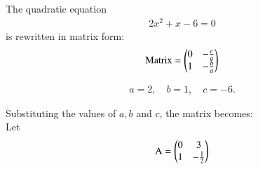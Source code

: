 \documentclass[journal]{IEEEtran}
\numberwithin{equation}{enumi}
\numberwithin{figure}{enumi}
\begin{document}
The quadratic equation 
\begin{align}
2x^2+x-6=0
\end{align}
is rewritten in matrix form:
\begin{align}
\text{Matrix} =
\begin{pmatrix}0 & -\frac{c}{a} \\
1 & -\frac{b}{a}
\end{pmatrix}
\end{align}

\begin{align}
a = 2, \quad b=1, \quad c = -6.
\end{align}

Substituting the values of $a,b$ and $c$, the matrix becomes:\\
Let
\begin{align}
\text{A} =
\begin{pmatrix}0 & 3 \\
1 & -\frac{1}{2}
\end{pmatrix}
\end{align}
\end{document}
